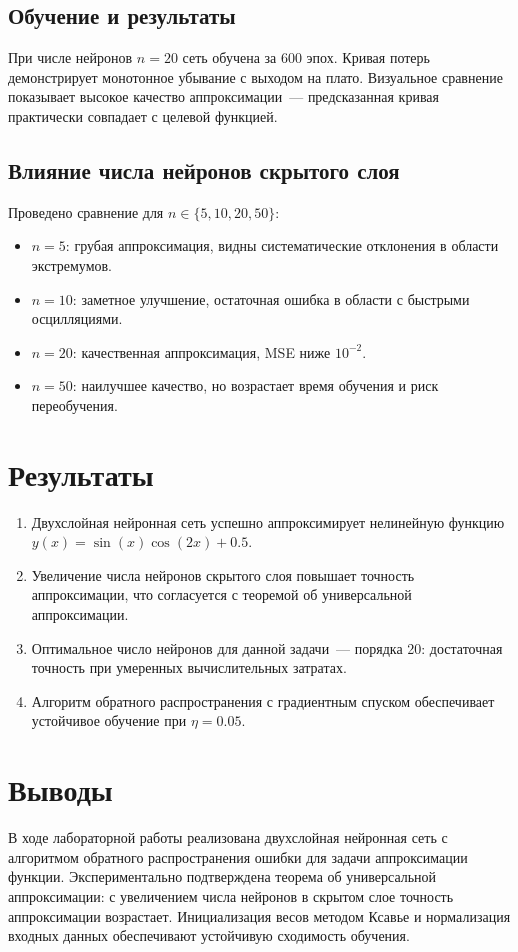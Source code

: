 \documentclass[14pt,a4paper]{extarticle}
\begin{document}
\subsection{Обучение и результаты}

При числе нейронов $n = 20$ сеть обучена за 600 эпох. Кривая потерь демонстрирует монотонное убывание с выходом на плато. Визуальное сравнение показывает высокое качество аппроксимации~--- предсказанная кривая практически совпадает с целевой функцией.

\subsection{Влияние числа нейронов скрытого слоя}

Проведено сравнение для $n \in \{5, 10, 20, 50\}$:

\begin{itemize}
\item $n = 5$: грубая аппроксимация, видны систематические отклонения в области экстремумов.
\item $n = 10$: заметное улучшение, остаточная ошибка в области с быстрыми осцилляциями.
\item $n = 20$: качественная аппроксимация, MSE ниже $10^{-2}$.
\item $n = 50$: наилучшее качество, но возрастает время обучения и риск переобучения.
\end{itemize}

\section{Результаты}

\begin{enumerate}
\item Двухслойная нейронная сеть успешно аппроксимирует нелинейную функцию $y(x) = \sin(x)\cos(2x) + 0.5$.
\item Увеличение числа нейронов скрытого слоя повышает точность аппроксимации, что согласуется с теоремой об универсальной аппроксимации.
\item Оптимальное число нейронов для данной задачи~--- порядка 20: достаточная точность при умеренных вычислительных затратах.
\item Алгоритм обратного распространения с градиентным спуском обеспечивает устойчивое обучение при $\eta = 0.05$.
\end{enumerate}

\section{Выводы}

В ходе лабораторной работы реализована двухслойная нейронная сеть с алгоритмом обратного распространения ошибки для задачи аппроксимации функции. Экспериментально подтверждена теорема об универсальной аппроксимации: с увеличением числа нейронов в скрытом слое точность аппроксимации возрастает. Инициализация весов методом Ксавье и нормализация входных данных обеспечивают устойчивую сходимость обучения.
\end{document}
